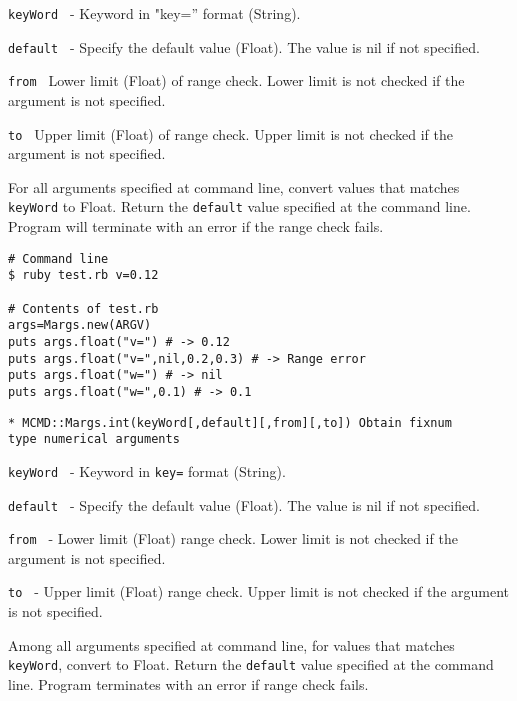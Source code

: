 \begin{description}
\item {\large \verb/keyWord /}  - Keyword in "key='' format (String).
\item {\large \verb/default /} - Specify the default value (Float). The value is nil if not specified. 
\item {\large \verb/from /} Lower limit (Float) of range check. Lower limit is not checked if the argument is not specified. 
\item {\large \verb/to /} Upper limit (Float) of range check. Upper limit is not checked if the argument is not specified. 
\end{description}

For all arguments specified at command line, convert values that matches \verb/keyWord/ to Float. Return the \verb/default/ value specified at the command line. Program will terminate with an error if the range check fails. 


\begin{Verbatim}[baselinestretch=0.7,frame=single]
# Command line
$ ruby test.rb v=0.12

# Contents of test.rb
args=Margs.new(ARGV)
puts args.float("v=") # -> 0.12
puts args.float("v=",nil,0.2,0.3) # -> Range error
puts args.float("w=") # -> nil
puts args.float("w=",0.1) # -> 0.1
\end{Verbatim}

{\Large
\begin{verbatim}
* MCMD::Margs.int(keyWord[,default][,from][,to]) Obtain fixnum 
type numerical arguments
\end{verbatim}
}

\begin{description}
\item {\large \verb/keyWord /} - Keyword in \verb/key=/ format (String).
\item {\large \verb/default /} - Specify the default value (Float). The value is nil if not specified. 
\item {\large \verb/from /} -  Lower limit (Float) range check. Lower limit is not checked if the argument is not specified. 
\item {\large \verb/to /} - Upper limit (Float) range check. Upper limit is not checked if the argument is not specified.
\end{description}

Among all arguments specified at command line, for values that matches \verb/keyWord/, convert to Float. Return the \verb/default/ value specified at the command line. 
Program terminates with an error if range check fails. 


